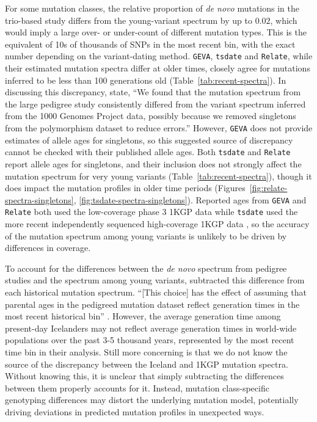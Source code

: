 \documentclass[]{article}
\newcommand{\GEVA}{\texttt{GEVA}\xspace}
\newcommand{\tsdate}{\texttt{tsdate}\xspace}
\newcommand{\relate}{\texttt{Relate}\xspace}
\begin{document}
For some mutation classes, the relative proportion of \emph{de novo} mutations
in the trio-based study differs from the young-variant spectrum by up to
$0.02$, which would imply a large over- or under-count of different mutation
types. This is the equivalent of 10s of thousands of SNPs in the most recent
bin, with the exact number depending on the variant-dating method.
\GEVA, \tsdate and \relate, while their estimated mutation spectra differ at
older times, closely agree for mutations inferred to be less than 100
generations old (Table~\ref{tab:recent-spectra}). In discussing this
discrepancy, \citet{wang2023human} state, ``We found that the mutation spectrum
from the large pedigree study consistently differed from the variant spectrum
inferred from the 1000 Genomes Project data, possibly because we removed
singletons from the polymorphism dataset to reduce errors.'' However, \GEVA does
not provide estimates of allele ages for singletons, so this suggested source
of discrepancy cannot be checked with their published allele ages. Both \tsdate
and \relate report allele ages for singletons, and their inclusion does not
strongly affect the mutation spectrum for very young variants
(Table~\ref{tab:recent-spectra}), though it does impact the mutation profiles
in older time periods (Figures~\ref{fig:relate-spectra-singletons},
\ref{fig:tsdate-spectra-singletons}). Reported ages from \GEVA and \relate both
used the low-coverage phase 3 1KGP data while \tsdate used the more recent
independently sequenced high-coverage 1KGP data \citep{byrska2022high}, so the
accuracy of the mutation spectrum among young variants is unlikely to be driven
by differences in coverage.

To account for the differences between the \emph{de novo} spectrum from
pedigree studies \citep{jonsson2017parental} and the spectrum among young
variants, \citet{wang2023human} subtracted this difference from each historical
mutation spectrum. ``[This choice] has the effect of assuming that parental ages
in the pedigreed mutation dataset reflect generation times in the most recent
historical bin'' \citep{wang2023human}. However, the average generation time
among present-day Icelanders may not reflect average generation times in
world-wide populations over the past 3-5 thousand years, represented by the
most recent time bin in their analysis. Still more concerning is that we do not
know the source of the discrepancy between the Iceland and 1KGP mutation
spectra. Without knowing this, it is unclear that simply subtracting the
differences between them properly accounts for it. Instead, mutation
class-specific genotyping differences may distort the underlying mutation
model, potentially driving deviations in predicted mutation profiles in
unexpected ways.
\end{document}
